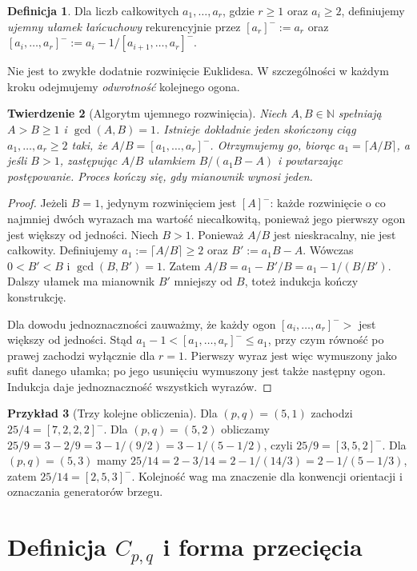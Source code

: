 \documentclass[11pt,a4paper]{report}
\numberwithin{equation}{section}
\theoremstyle{plain}
\newtheorem{twierdzenie}{Twierdzenie}[section]
\theoremstyle{definition}
\newtheorem{definicja}[twierdzenie]{Definicja}
\newtheorem{przyklad}[twierdzenie]{Przykład}
\theoremstyle{remark}
\begin{document}
\begin{definicja}
Dla liczb całkowitych $a_1,\ldots,a_r$, gdzie $r\geq1$ oraz
$a_i\geq2$, definiujemy \emph{ujemny ułamek łańcuchowy}
rekurencyjnie przez $[a_r]^-:=a_r$ oraz
$[a_i,\ldots,a_r]^-:=a_i-1/[a_{i+1},\ldots,a_r]^-$.
\end{definicja}

Nie jest to zwykłe dodatnie rozwinięcie Euklidesa. W szczególności
w każdym kroku odejmujemy \emph{odwrotność} kolejnego ogona.

\begin{twierdzenie}[Algorytm ujemnego rozwinięcia]
\label{thm:tg-cf-algorithm}
Niech $A,B\in\mathbb N$ spełniają $A>B\geq1$ i
$\gcd(A,B)=1$. Istnieje dokładnie jeden skończony ciąg
$a_1,\ldots,a_r\geq2$ taki, że $A/B=[a_1,\ldots,a_r]^-$. 
Otrzymujemy go, biorąc $a_1=\lceil A/B\rceil$, a jeśli
$B>1$, zastępując $A/B$ ułamkiem $B/(a_1B-A)$ i powtarzając
postępowanie. Proces kończy się, gdy mianownik wynosi jeden.
\end{twierdzenie}

\begin{proof}
Jeżeli $B=1$, jedynym rozwinięciem jest $[A]^-$: każde
rozwinięcie o co najmniej dwóch wyrazach ma wartość niecałkowitą,
ponieważ jego pierwszy ogon jest większy od jedności. Niech
$B>1$. Ponieważ $A/B$ jest nieskracalny, nie jest całkowity.
Definiujemy $a_1:=\lceil A/B\rceil\geq2$ oraz
$B':=a_1B-A$. Wówczas $0<B'<B$ i $\gcd(B,B')=1$.
Zatem
$A/B=a_1-B'/B=a_1-1/(B/B')$.
Dalszy ułamek ma mianownik $B'$ mniejszy od $B$, toteż
indukcja kończy konstrukcję.

Dla dowodu jednoznaczności zauważmy, że każdy ogon
$[a_i,\ldots,a_r]^->$ jest większy od jedności. Stąd
$a_1-1<[a_1,\ldots,a_r]^-\leq a_1$, przy czym równość
po prawej zachodzi wyłącznie dla $r=1$.
Pierwszy wyraz jest więc wymuszony jako sufit danego ułamka;
po jego usunięciu wymuszony jest także następny ogon.
Indukcja daje jednoznaczność wszystkich wyrazów.
\end{proof}

\begin{przyklad}[Trzy kolejne obliczenia]
Dla $(p,q)=(5,1)$ zachodzi $25/4=[7,2,2,2]^-$.
Dla $(p,q)=(5,2)$ obliczamy
$25/9=3-2/9=3-1/(9/2)=3-1/(5-1/2)$, czyli
$25/9=[3,5,2]^-$. Dla $(p,q)=(5,3)$ mamy
$25/14=2-3/14=2-1/(14/3)=2-1/(5-1/3)$,
zatem $25/14=[2,5,3]^-$. Kolejność wag ma znaczenie dla
konwencji orientacji i oznaczania generatorów brzegu.
\end{przyklad}

\section{Definicja \texorpdfstring{$C_{p,q}$}{Cpq} i forma przecięcia}
\label{sec:tg-general-config}
\end{document}

